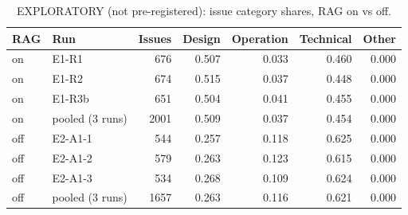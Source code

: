 \begin{table}[t]
\centering
\small
\caption{EXPLORATORY (not pre-registered): issue category shares, RAG on vs off.}
\label{tab:e7-exp-cat-onoff}
\begin{tabular}{llrrrrr}
\toprule
RAG & Run & Issues & Design & Operation & Technical & Other \\
\midrule
on & E1-R1 & 676 & 0.507 & 0.033 & 0.460 & 0.000 \\
on & E1-R2 & 674 & 0.515 & 0.037 & 0.448 & 0.000 \\
on & E1-R3b & 651 & 0.504 & 0.041 & 0.455 & 0.000 \\
on & pooled (3 runs) & 2001 & 0.509 & 0.037 & 0.454 & 0.000 \\
off & E2-A1-1 & 544 & 0.257 & 0.118 & 0.625 & 0.000 \\
off & E2-A1-2 & 579 & 0.263 & 0.123 & 0.615 & 0.000 \\
off & E2-A1-3 & 534 & 0.268 & 0.109 & 0.624 & 0.000 \\
off & pooled (3 runs) & 1657 & 0.263 & 0.116 & 0.621 & 0.000 \\
\bottomrule
\end{tabular}
\end{table}
